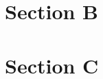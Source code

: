 \documentclass[12pt]{article}
\newcommand{\mycomment}[1]{}
\begin{document}
\mycomment{
\numberofauthors{1}
\author{
\alignauthor
Arpit Christi, Matthew Lyle Olson, Mohammad Amin Alipour, Alex Groce\\
\affaddr{School of Electrical Engineering and Computer Science}\\
\affaddr{Oregon State University}
\affaddr{Corvallis, OR USA}\\
}
}

\maketitle
\newpage
{}
\section{Section B}

\section{Section C}



%

%

%



%


%




\end{document}
